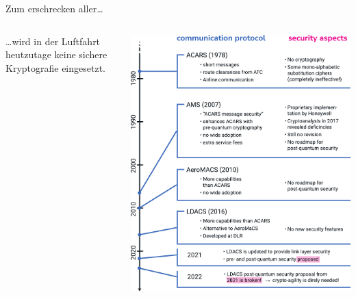 \begin{frame}[c]{Zum erschrecken aller…}
  \begin{columns}[fullwidth,c]
    \begin{column}{.5\linewidth}

        \footnotesize
        …wird in der Luftfahrt heutzutage keine sichere Kryptografie eingesetzt. 
    \end{column}%
    \begin{column}{.5\linewidth}
      \includegraphics[width=.92\linewidth]{graphics/history of cryptography in avionics}
    \end{column}
  \end{columns}
\end{frame}


